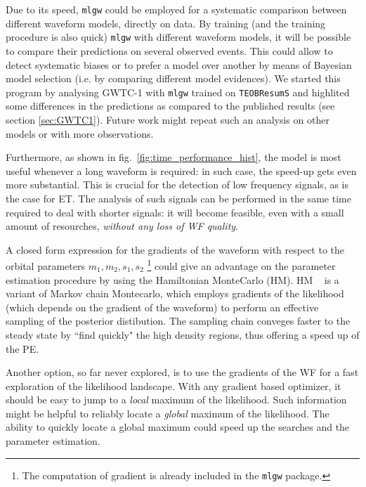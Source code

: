Due to its speed, \texttt{mlgw} could be employed for a systematic comparison between different waveform models, directly on data.
By training (and the training procedure is also quick) \texttt{mlgw} with different waveform models, it will be possible to compare their predictions on several observed events. This could allow to detect systematic biases or to prefer a model over another by means of Bayesian model selection (i.e. by comparing different model evidences).
We started this program by analysing GWTC-1 with \texttt{mlgw} trained on \texttt{TEOBResumS} and highlited some differences in the predictions as compared to the published results (see section \ref{sec:GWTC1}). Future work might repeat such an analysis on other models or with more observations.
\par
Furthermore, as shown in fig.~\ref{fig:time_performance_hist}, the model is most useful whenever a long waveform is required: in such case, the speed-up gets even more substantial.
This is crucial for the detection of low frequency signals, as is the case for ET. The analysis of such signals can be performed in the same time required to deal with shorter signals: it will become feasible, even with a small amount of resourches, \textit{without any loss of WF quality}.
\par
A closed form expression for the gradients of the waveform with respect to the orbital parameters $m_1,m_2, {s}_1,{s}_2$
\footnote{The computation of gradient is already included in the \texttt{mlgw} package.}
could give an advantage on the parameter estimation procedure by using the Hamiltonian MonteCarlo (HM).
HM \cite{betancourt2017hamiltonianMC}~\cite{Porter2014Hamiltonian_MonteCarlo} is a variant of Markov chain Montecarlo, which employs gradients of the likelihood (which depends on the gradient of the waveform) to perform an effective sampling of the posterior distibution. The sampling chain conveges faster to the steady state by ``find quickly" the high density regions, thus offering a speed up of the PE.
\par
Another option, so far never explored, is to use the gradients of the WF for a fast exploration of the likelihood landscape. With any gradient based optimizer, it should be easy to jump to a \textit{local} maximum of the likelihood. Such information might be helpful to reliably locate a \textit{global} maximum of the likelihood.
The ability to quickly locate a global maximum could speed up the searches and the parameter estimation.
\par
{}



